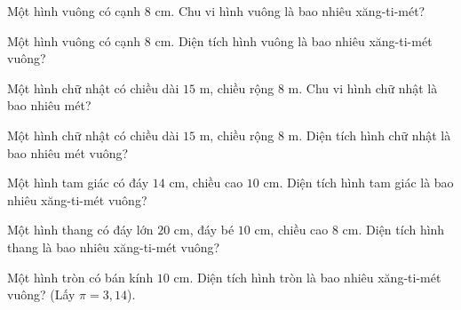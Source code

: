 
\begin{ex}
  Một hình vuông có cạnh $8\text{ cm}$. Chu vi hình vuông là bao nhiêu xăng-ti-mét?
\end{ex}

\begin{ex}
  Một hình vuông có cạnh $8\text{ cm}$. Diện tích hình vuông là bao nhiêu xăng-ti-mét vuông?
\end{ex}

\begin{ex}
  Một hình chữ nhật có chiều dài $15\text{ m}$, chiều rộng $8\text{ m}$. Chu vi hình chữ nhật là bao nhiêu mét?
\end{ex}

\begin{ex}
  Một hình chữ nhật có chiều dài $15\text{ m}$, chiều rộng $8\text{ m}$. Diện tích hình chữ nhật là bao nhiêu mét vuông?
\end{ex}

\begin{ex}
  Một hình tam giác có đáy $14\text{ cm}$, chiều cao $10\text{ cm}$. Diện tích hình tam giác là bao nhiêu xăng-ti-mét vuông?
\end{ex}

\begin{ex}
  Một hình thang có đáy lớn $20\text{ cm}$, đáy bé $10\text{ cm}$, chiều cao $8\text{ cm}$. Diện tích hình thang là bao nhiêu xăng-ti-mét vuông?
\end{ex}

\begin{ex}
  Một hình tròn có bán kính $10\text{ cm}$. Diện tích hình tròn là bao nhiêu xăng-ti-mét vuông? (Lấy $\pi = 3{,}14$).
\end{ex}

